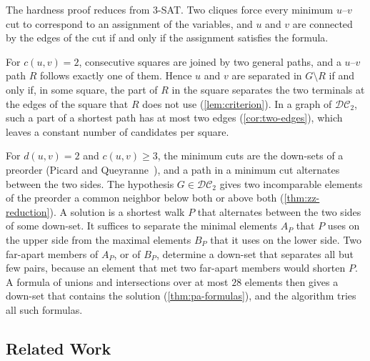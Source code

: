 \documentclass[pdflatex,sn-mathphys-num]{sn-jnl}%
\theoremstyle{thmstyleone}%
\theoremstyle{thmstyletwo}%
\theoremstyle{thmstylethree}%
\newcommand{\DC}{\mathcal{DC}_2}%
\begin{document}
The hardness proof reduces from 3-SAT.
Two cliques force every minimum $u$--$v$ cut to correspond to an assignment of the variables, and $u$ and $v$ are connected by the edges of the cut if and only if the assignment satisfies the formula.

For $c(u, v) = 2$, consecutive squares are joined by two general paths, and a $u$--$v$ path $R$ follows exactly one of them.
Hence $u$ and $v$ are separated in $G \setminus R$ if and only if, in some square, the part of $R$ in the square separates the two terminals at the edges of the square that $R$ does not use (\cref{lem:criterion}).
In a graph of $\DC$, such a part of a shortest path has at most two edges (\cref{cor:two-edges}), which leaves a constant number of candidates per square.

For $d(u, v) = 2$ and $c(u, v) \geq 3$, the minimum cuts are the down-sets of a preorder (Picard and Queyranne~\cite{PicardQueyranne1980}), and a path in a minimum cut alternates between the two sides.
The hypothesis $G \in \DC$ gives two incomparable elements of the preorder a common neighbor below both or above both (\cref{thm:zz-reduction}).
A solution is a shortest walk $P$ that alternates between the two sides of some down-set.
It suffices to separate the minimal elements $A_P$ that $P$ uses on the upper side from the maximal elements $B_P$ that it uses on the lower side.
Two far-apart members of $A_P$, or of $B_P$, determine a down-set that separates all but few pairs, because an element that met two far-apart members would shorten $P$.
A formula of unions and intersections over at most $28$ elements then gives a down-set that contains the solution (\cref{thm:pa-formulas}), and the algorithm tries all such formulas.

\subsection{Related Work}\label{sec:related-work}
\end{document}
